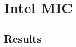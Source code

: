 \documentclass[../thesis]{subfiles}
\begin{document}
	\chapter{Intel MIC}
	\label{chp:mic}

	
	
	
	

	\section{Results}
\end{document}

